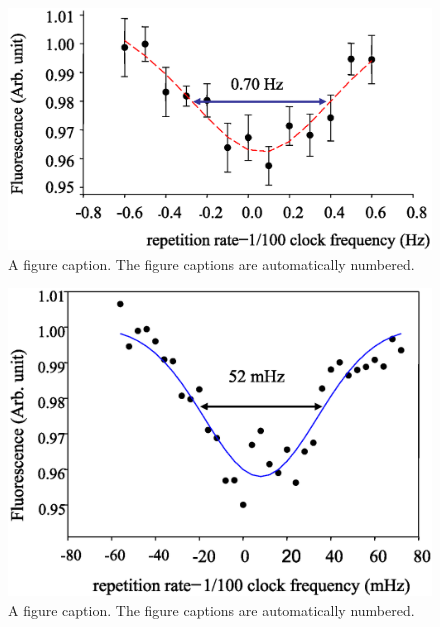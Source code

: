 \documentclass[%
aps,
prl,
showpacs,
twocolumn,
]{revtex4}
\begin{document}
\begin{figure}
\includegraphics[scale=0.5]{cpt1_word}
\caption{\label{fig:cpt1} A figure caption. The figure captions are
automatically numbered.}
\end{figure}


\begin{figure}
\includegraphics[scale=0.5]{cpt3_word}
\caption{\label{fig:cpt2better} A figure caption. The figure captions are
automatically numbered.}
\end{figure}
\end{document}
